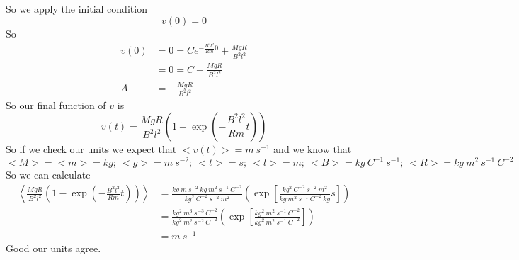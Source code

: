 \documentclass[11pt]{article}
\numberwithin{equation}{section}
\begin{document}
So we apply the initial condition
$$v(0) = 0$$
So 
\begin{align*}
v(0) &= 0 = Ce^{-\frac{B^2l^2}{Rm}0}  + \frac{MgR}{B^2l^2}\\
&= 0 = C  + \frac{MgR}{B^2l^2}\\
A  &= -\frac{MgR}{B^2l^2}
\end{align*}
So our final function of $v$ is
$$v(t) = \frac{MgR}{B^2l^2}\left(1 - \exp\left({-\frac{B^2l^2}{Rm}t}\right)\right)$$
So if we check our units we expect that $<v(t)> = m\ s^{-1}$ and we know that
$$<M> = <m> = kg;\ <g> = m\ s^{-2};\ <t> = s;\ <l> = m;\ <B> = kg\ C^{-1}\ s^{-1};\ <R> = kg\ m^2\ s^{-1}\ C^{-2}$$
So we can calculate 
\begin{align*}
\left<\frac{MgR}{B^2l^2}\left(1 - \exp\left({-\frac{B^2l^2}{Rm}t}\right)\right)\right> &= \frac{kg\ m\ s^{-2}\ kg\ m^2\ s^{-1}\ C^{-2}}{kg^2\ C^{-2}\ s^{-2}\ m^2}\left(\exp\left[\frac{kg^2\ C^{-2}\ s^{-2}\ m^2}{kg\ m^2\ s^{-1}\ C^{-2}\ kg}s\right]\right)\\
&= \frac{kg^2\ m^3\ s^{-3}\ C^{-2}}{kg^2\ m^2\ s^{-2}\ C^{-2}}\left(\exp\left[\frac{kg^2\ m^2\ s^{-1}\ C^{-2}}{kg^2\ m^2\ s^{-1}\ C^{-2}}\right]\right)\\
&= m\ s^{-1}
\end{align*}
Good our units agree.
\end{document}
